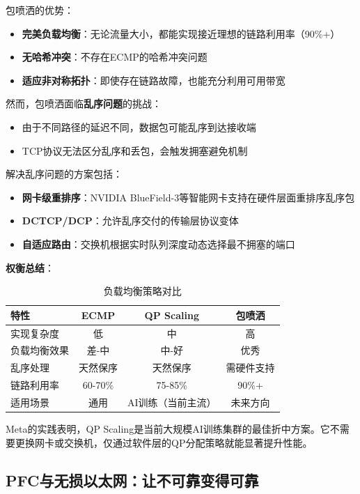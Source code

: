 包喷洒的优势：
\begin{itemize}
    \item \textbf{完美负载均衡}：无论流量大小，都能实现接近理想的链路利用率（90\%+）
    \item \textbf{无哈希冲突}：不存在ECMP的哈希冲突问题
    \item \textbf{适应非对称拓扑}：即使存在链路故障，也能充分利用可用带宽
\end{itemize}

然而，包喷洒面临\textbf{乱序问题}的挑战：
\begin{itemize}
    \item 由于不同路径的延迟不同，数据包可能乱序到达接收端
    \item TCP协议无法区分乱序和丢包，会触发拥塞避免机制
\end{itemize}

解决乱序问题的方案包括：
\begin{itemize}
    \item \textbf{网卡级重排序}：NVIDIA BlueField-3等智能网卡支持在硬件层面重排序乱序包
    \item \textbf{DCTCP/DCP}：允许乱序交付的传输层协议变体
    \item \textbf{自适应路由}：交换机根据实时队列深度动态选择最不拥塞的端口
\end{itemize}

\textbf{权衡总结}：

\begin{table}[htbp]
\centering
\caption{负载均衡策略对比}
\label{tab:load_balance_comparison}
\begin{tabular}{|l|c|c|c|}
\hline
\textbf{特性} & \textbf{ECMP} & \textbf{QP Scaling} & \textbf{包喷洒} \\
\hline
实现复杂度 & 低 & 中 & 高 \\
\hline
负载均衡效果 & 差-中 & 中-好 & 优秀 \\
\hline
乱序处理 & 天然保序 & 天然保序 & 需硬件支持 \\
\hline
链路利用率 & 60-70\% & 75-85\% & 90\%+ \\
\hline
适用场景 & 通用 & AI训练（当前主流） & 未来方向 \\
\hline
\end{tabular}
\end{table}

Meta的实践表明，QP Scaling是当前大规模AI训练集群的最佳折中方案。它不需要更换网卡或交换机，仅通过软件层的QP分配策略就能显著提升性能。

\subsection{PFC与无损以太网：让不可靠变得可靠}

